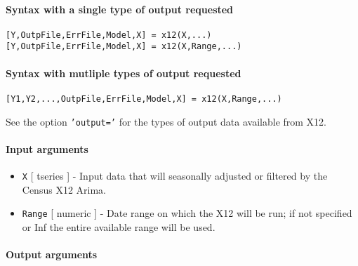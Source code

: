 


	\paragraph{Syntax with a single type of output
requested}

\begin{verbatim}
[Y,OutpFile,ErrFile,Model,X] = x12(X,...)
[Y,OutpFile,ErrFile,Model,X] = x12(X,Range,...)
\end{verbatim}

\paragraph{Syntax with mutliple types of output
requested}

\begin{verbatim}
[Y1,Y2,...,OutpFile,ErrFile,Model,X] = x12(X,Range,...)
\end{verbatim}

See the option \texttt{'output='} for the types of output data available
from X12.

\paragraph{Input arguments}

\begin{itemize}
\item
  \texttt{X} {[} tseries {]} - Input data that will seasonally adjusted
  or filtered by the Census X12 Arima.
\item
  \texttt{Range} {[} numeric {]} - Date range on which the X12 will be
  run; if not specified or Inf the entire available range will be used.
\end{itemize}

\paragraph{Output arguments}

